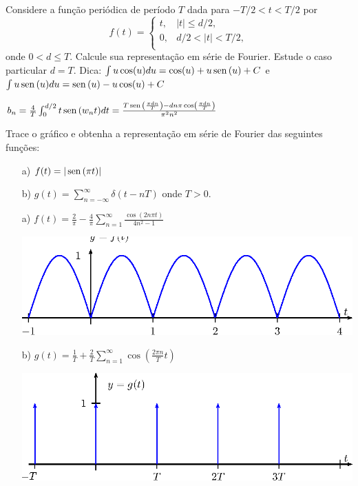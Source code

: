 \begin{exer}Considere a função periódica de período $T$ dada para $-T/2<t<T/2$ por
\begin{equation}f(t)=\left\{
\begin{array}{lc}
t,&|t|\leq d/2,\\
0,&d/2<|t|<T/2,\\
\end{array}
\right.\end{equation}
onde $0<d\leq T$. Calcule sua representação em série de Fourier. Estude o caso particular $d=T$. Dica: $\int u\cos(u)du=\cos(u)+u\operatorname{sen}\,(u)+C$ e $\int u\operatorname{sen}\,(u)du=\operatorname{sen}\,(u)-u\cos(u)+C$
 \end{exer}
\begin{resp}
 $
b_n=\frac{4}{T}\int_{0}^{d/2}t\operatorname{sen}\,(w_nt)dt=\frac{T\operatorname{sen}\,\left(\frac{\pi d n}{T}\right)-dn\pi\cos\left(\frac{\pi d n}{T}\right)}{\pi^2 n^2}
$
\end{resp}
\begin{exer}{\label{Fourier_8}} Trace o gráfico e obtenha a representação em série de Fourier das seguintes funções:
\begin{itemize}
 \item [a)] $f(t)=|\operatorname{sen}\,(\pi t)|$
 \item [b)] $g(t)=\sum_{n=-\infty}^\infty \delta(t-nT)$ onde $T>0$.
\end{itemize}
\end{exer}
\begin{resp}
\begin{itemize}
 \item [a)] $f(t)=\frac{2}{\pi}- \frac{4}{\pi}\sum_{n=1}^\infty \frac{\cos(2n\pi t)}{4n^2-1}$
\begin{center}

\includegraphics{cap_series/pics/figura_6}\end{center}
 \item [b)] $g(t)=\frac{1}{T}+ \frac{2}{T} \sum_{n=1}^\infty \cos\left(\frac{2\pi n}{T} t\right)$
\begin{center}

\includegraphics{cap_series/pics/figura_7}\end{center}
 \end{itemize}
\end{resp}
